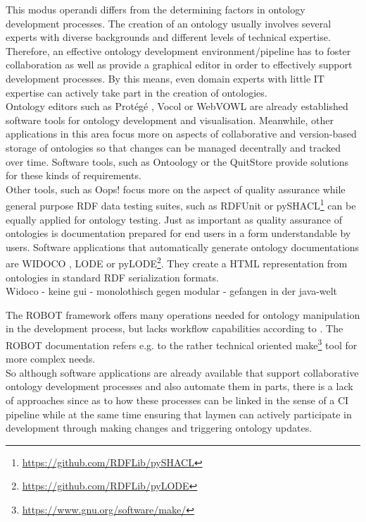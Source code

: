\documentclass[sigconf]{acmart}
\begin{document}
This modus operandi differs from the determining factors in ontology development processes. The creation of an ontology usually involves several experts with diverse backgrounds and different levels of technical expertise. Therefore, an effective ontology development environment/pipeline has to foster collaboration as well as provide a graphical editor in order to effectively support development processes. By this means, even domain experts with little IT expertise can actively take part in the creation of ontologies.\\
Ontology editors such as Protégé \cite{protege}, Vocol \cite{halilaj} or WebVOWL \cite{lohmann} are already established software tools for ontology development and visualisation. Meanwhile, other applications in this area focus more on aspects of collaborative and version-based storage of ontologies so that changes can be managed decentrally and tracked over time. Software tools, such as Ontoology \cite{alobaid} or the QuitStore \cite{arndt} provide solutions for these kinds of requirements.\\
Other tools, such as Oops! focus more on the aspect of quality assurance \cite{poveda} while general purpose RDF data testing suites, such as RDFUnit \cite{rdfunit} or pySHACL\footnote{\url{https://github.com/RDFLib/pySHACL}} can be equally applied for ontology testing. Just as important as quality assurance of ontologies is documentation prepared for end users in a form understandable by users. Software applications that automatically generate ontology documentations are WIDOCO \cite{widoco}, LODE \cite{lode} or pyLODE\footnote{\url{https://github.com/RDFLib/pyLODE}}. They create a HTML representation from ontologies in standard RDF serialization formats.\\

Widoco 
- keine gui
- monolothisch gegen modular
- gefangen in der java-welt

The ROBOT framework \cite{jackson} offers many operations needed for ontology manipulation in the development process, but lacks workflow capabilities according to \cite{jackson}. The ROBOT documentation refers e.g. to the rather technical oriented make\footnote{\url{https://www.gnu.org/software/make/}} tool for more complex needs.\\
So although software applications are already available that support collaborative ontology development processes and also automate them in parts, there is a lack of approaches since \cite{mungall} as to how these processes can be linked in the sense of a CI pipeline while at the same time ensuring that laymen can actively participate in development through making changes and triggering ontology updates.
\end{document}
